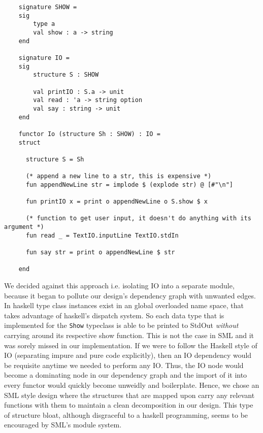 \documentclass[9pt,letterpaper]{extarticle}
\begin{document}
  \begin{verbatim}
    signature SHOW =
    sig
        type a
        val show : a -> string
    end
    
    signature IO =
    sig
        structure S : SHOW
    
        val printIO : S.a -> unit
        val read : 'a -> string option
        val say : string -> unit
    end
    
    functor Io (structure Sh : SHOW) : IO =
    struct
    
      structure S = Sh
    
      (* append a new line to a str, this is expensive *)
      fun appendNewLine str = implode $ (explode str) @ [#"\n"]
    
      fun printIO x = print o appendNewLine o S.show $ x
    
      (* function to get user input, it doesn't do anything with its argument *)
      fun read _ = TextIO.inputLine TextIO.stdIn
    
      fun say str = print o appendNewLine $ str
    
    end
  \end{verbatim}
  We decided against this approach i.e. isolating IO into a separate module,
  because it began to pollute our design's dependency graph with unwanted edges.
  In haskell type class instances exist in an global overloaded name space, that
  takes advantage of haskell's dispatch system. So each data type that is
  implemented for the \texttt{Show} typeclass is able to be printed to StdOut
  \textit{without} carrying around its respective show function. This is not the
  case in SML and it was sorely missed in our implementation. If we were to
  follow the Haskell style of IO (separating impure and pure code explicitly),
  then an IO dependency would be requisite anytime we needed to perform any IO.
  Thus, the IO node would become a dominating node in our dependency graph and
  the import of it into every functor would quickly become unweidly and
  boilerplate. Hence, we chose an SML style design where the structures that are
  mapped upon carry any relevant functions with them to maintain a clean
  decomposition in our design. This type of structure bloat, although
  disgraceful to a haskell programming, seems to be encouraged by SML's module
  system.
\end{document}
